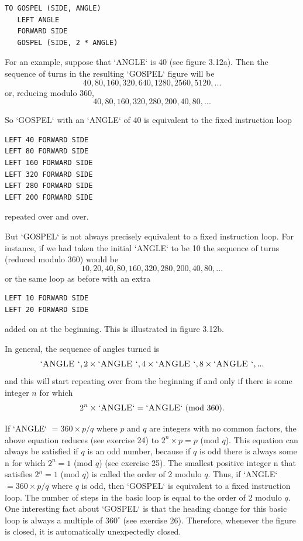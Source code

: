 \documentclass{book}
\begin{document}
\begin{verbatim}
TO GOSPEL (SIDE, ANGLE)
   LEFT ANGLE
   FORWARD SIDE
   GOSPEL (SIDE, 2 * ANGLE)
\end{verbatim}
For an example, suppose that \textsc{`ANGLE`} is 40 (see figure 3.12a). Then the
sequence of turns in the resulting \textsc{`GOSPEL`} figure will be $$40, 80, 160, 320, 640, 1280, 2560, 5120,...$$ or, reducing modulo 360, $$40, 80, 160, 320, 280, 200, 40, 80,...$$

So \textsc{`GOSPEL`} with an \textsc{`ANGLE`} of 40 is equivalent to the fixed instruction loop

\begin{verbatim}
LEFT 40 FORWARD SIDE
LEFT 80 FORWARD SIDE
LEFT 160 FORWARD SIDE
LEFT 320 FORWARD SIDE
LEFT 280 FORWARD SIDE
LEFT 200 FORWARD SIDE
\end{verbatim}
repeated over and over.

But \textsc{`GOSPEL`} is not always precisely equivalent to a fixed instruction
loop. For instance, if we had taken the initial \textsc{`ANGLE`} to be 10 the sequence
of turns (reduced modulo 360) would be $$10, 20, 40, 80, 160, 320, 280, 200, 40, 80,...$$ or the same loop as before with an extra

\begin{verbatim}
LEFT 10 FORWARD SIDE
LEFT 20 FORWARD SIDE
\end{verbatim}
added on at the beginning. This is illustrated in figure 3.12b.

In general, the sequence of angles turned is $$\text{\textsc{`ANGLE `}}, 2 \times \text{\textsc{`ANGLE `}}, 4 \times \text{\textsc{`ANGLE `}}, 8 \times \text{\textsc{`ANGLE `}}, ...$$ and this will start repeating over from the beginning if and only if there
is some integer $n$ for which
$$2^n \times \text{\textsc{`ANGLE`}} = \text{\textsc{`ANGLE`} (mod 360).}$$

If \textsc{`ANGLE`} $= 360 \times p/q$ where $p$ and $q$ are integers with no common
factors, the above equation reduces (see exercise 24) to $2^n \times p = p$
(mod $q$). This equation can always be satisfied if $q$ is an odd number,
because if $q$ is odd there is always some n for which $2^n = 1$ (mod $q$)
(see exercise 25). The smallest positive integer n that satisfies $2^n = 1$
(mod $q$) is called the order of 2 modulo $q$. Thus,
if \textsc{`ANGLE`} $= 360 \times p/q$ where $q$ is odd, then \textsc{`GOSPEL`} is equivalent to a
fixed instruction loop. The number of steps in the basic loop is equal to
the order of 2 modulo $q$.
One interesting fact about \textsc{`GOSPEL`} is that the heading change for this
basic loop is always a multiple of $360^{\circ}$ (see exercise 26). Therefore,
whenever the figure is closed, it is automatically unexpectedly closed.
\end{document}
